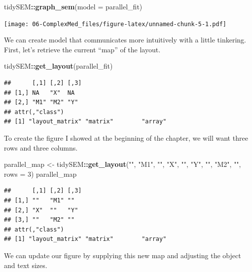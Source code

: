 \documentclass[
  11pt,
]{book}
\newenvironment{Shaded}{\begin{snugshade}}{\end{snugshade}}
\newcommand{\AttributeTok}[1]{\textcolor[rgb]{0.27,0.27,0.27}{#1}}
\newcommand{\DecValTok}[1]{\textcolor[rgb]{0.06,0.06,0.06}{#1}}
\newcommand{\FunctionTok}[1]{\textcolor[rgb]{0.27,0.27,0.27}{\textbf{#1}}}
\newcommand{\NormalTok}[1]{#1}
\newcommand{\OtherTok}[1]{\textcolor[rgb]{0.37,0.37,0.37}{#1}}
\newcommand{\SpecialCharTok}[1]{\textcolor[rgb]{0.43,0.43,0.43}{\textbf{#1}}}
\newcommand{\StringTok}[1]{\textcolor[rgb]{0.5,0.5,0.5}{#1}}
\begin{document}
\begin{Shaded}
\begin{Highlighting}[]
\NormalTok{tidySEM}\SpecialCharTok{::}\FunctionTok{graph\_sem}\NormalTok{(}\AttributeTok{model =}\NormalTok{ parallel\_fit)}
\end{Highlighting}
\end{Shaded}

\texttt{[image: 06-ComplexMed\_files/figure-latex/unnamed-chunk-5-1.pdf]}

We can create model that communicates more intuitively with a little tinkering. First, let's retrieve the current ``map'' of the layout.

\begin{Shaded}
\begin{Highlighting}[]
\NormalTok{tidySEM}\SpecialCharTok{::}\FunctionTok{get\_layout}\NormalTok{(parallel\_fit)}
\end{Highlighting}
\end{Shaded}

\begin{verbatim}
##      [,1] [,2] [,3]
## [1,] NA   "X"  NA  
## [2,] "M1" "M2" "Y" 
## attr(,"class")
## [1] "layout_matrix" "matrix"        "array"
\end{verbatim}

To create the figure I showed at the beginning of the chapter, we will want three rows and three columns.

\begin{Shaded}
\begin{Highlighting}[]
\NormalTok{parallel\_map }\OtherTok{\textless{}{-}}\NormalTok{ tidySEM}\SpecialCharTok{::}\FunctionTok{get\_layout}\NormalTok{(}\StringTok{""}\NormalTok{, }\StringTok{"M1"}\NormalTok{, }\StringTok{""}\NormalTok{, }\StringTok{"X"}\NormalTok{, }\StringTok{""}\NormalTok{, }\StringTok{"Y"}\NormalTok{, }\StringTok{""}\NormalTok{, }\StringTok{"M2"}\NormalTok{,}
    \StringTok{""}\NormalTok{, }\AttributeTok{rows =} \DecValTok{3}\NormalTok{)}
\NormalTok{parallel\_map}
\end{Highlighting}
\end{Shaded}

\begin{verbatim}
##      [,1] [,2] [,3]
## [1,] ""   "M1" ""  
## [2,] "X"  ""   "Y" 
## [3,] ""   "M2" ""  
## attr(,"class")
## [1] "layout_matrix" "matrix"        "array"
\end{verbatim}

We can update our figure by supplying this new map and adjusting the object and text sizes.
\end{document}
